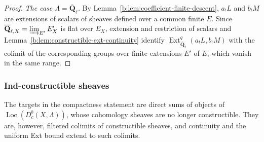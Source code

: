 \documentclass[11pt,a4paper]{article}
\numberwithin{equation}{section}
\theoremstyle{definition}
\theoremstyle{remark}
\newcommand{\Dbc}{D^b_c}
\newcommand{\Loc}{\operatorname{Loc}}
\newcommand{\Qbar}{\overline{\mathbf Q}_\ell}
\newcommand{\Ext}{\operatorname{Ext}}
\newcommand{\QbarX}{\overline{\mathbf Q}_{\ell,X}}
\begin{document}
\begin{proof}
\emph{The case $\Lambda=\Qbar$.} By
Lemma~\ref{b:lem:coefficient-finite-descent}, $a_!L$ and $b_!M$ are
extensions of scalars of sheaves defined over a common finite $E$. Since
$\QbarX=\varinjlim_{E'}E'_X$ is flat over $E_X$, extension and restriction
of scalars and Lemma~\ref{b:lem:constructible-ext-continuity} identify
$\Ext^q_{\Qbar}(a_!L,b_!M)$ with the colimit of the corresponding groups
over finite extensions $E'$ of $E$, which vanish in the same range.
\end{proof}

\subsubsection{Ind-constructible sheaves}

The targets in the compactness statement are direct sums of objects of
$\Loc(\Dbc(X,\Lambda))$, whose cohomology sheaves are no longer
constructible. They are, however, filtered colimits of constructible
sheaves, and continuity and the uniform Ext bound extend to such
colimits.
\end{document}
